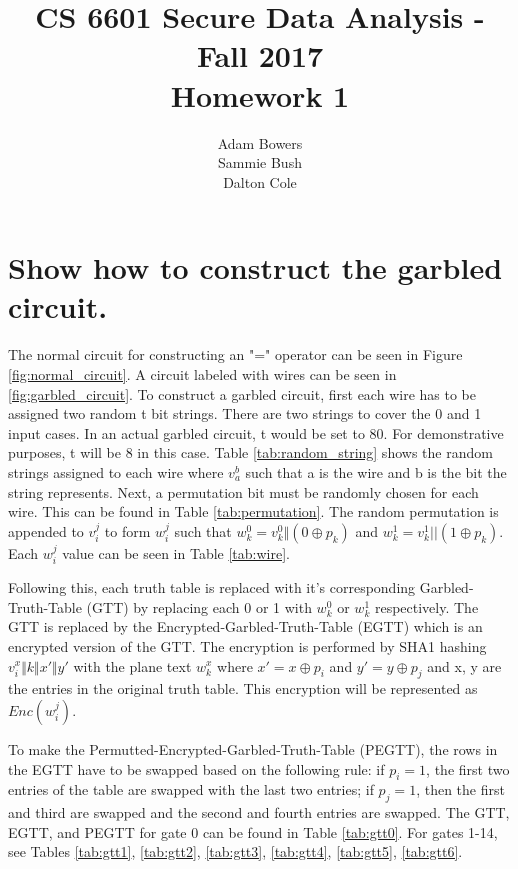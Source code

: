 \documentclass[times]{article}
\begin{document}
	\title{CS 6601 Secure Data Analysis - Fall 2017 \\ Homework 1}
	\author{Adam Bowers \\ Sammie Bush \\ Dalton Cole}
	\date{}
	\maketitle

	\section{Show how to construct the garbled circuit.}
	The normal circuit for constructing an "=" operator can be seen in Figure \ref{fig:normal_circuit}. A circuit labeled with wires can be seen in \ref{fig:garbled_circuit}. To construct a garbled circuit, first each wire has to be assigned two random t bit strings. There are two strings to cover the 0 and 1 input cases. In an actual garbled circuit, t would be set to 80. For demonstrative purposes, t will be 8 in this case. Table \ref{tab:random_string} shows the random strings assigned to each wire where $v_a^b$ such that a is the wire and b is the bit the string represents. Next, a permutation bit must be randomly chosen for each wire. This can be found in Table \ref{tab:permutation}. The random permutation is appended to $v_i^j$ to form $w_i^j$ such that $w_k^0 = v_k^0 \Vert (0 \oplus p_k)$ and $w_k^1 = v_k^1 || (1 \oplus p_k)$. Each $w_i^j$ value can be seen in Table \ref{tab:wire}. 

	Following this, each truth table is replaced with it's corresponding Garbled-Truth-Table (GTT) by replacing each 0 or 1 with $w_k^0$ or $w_k^1$ respectively. The GTT is replaced by the Encrypted-Garbled-Truth-Table (EGTT) which is an encrypted version of the GTT. The encryption is performed by SHA1 hashing $v_i^x \Vert k \Vert x' \Vert y'$ with the plane text $w_k^x$ where $x' = x \oplus p_i$ and  $y' = y \oplus p_j$ and x, y are the entries in the original truth table. This encryption will be represented as $Enc(w_i^j)$. 

	To make the Permutted-Encrypted-Garbled-Truth-Table (PEGTT), the rows in the EGTT have to be swapped based on the following rule: if $p_i = 1$, the first two entries of the table are swapped with the last two entries; if $p_j = 1$, then the first and third are swapped and the second and fourth entries are swapped. The GTT, EGTT, and PEGTT for gate 0 can be found in Table \ref{tab:gtt0}. For gates 1-14, see Tables \ref{tab:gtt1}, \ref{tab:gtt2}, \ref{tab:gtt3}, \ref{tab:gtt4}, \ref{tab:gtt5}, \ref{tab:gtt6}.
	
\end{document}
